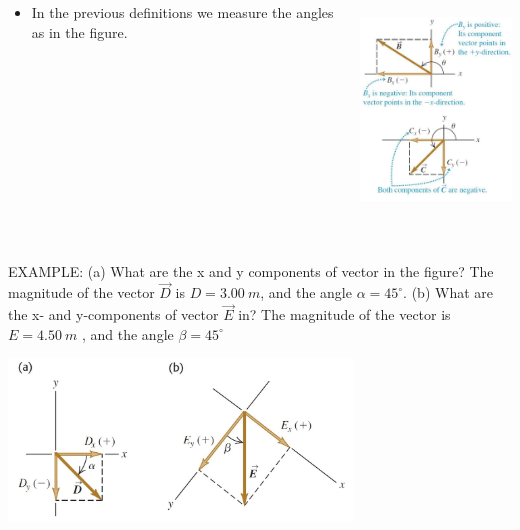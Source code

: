 \documentclass[]{beamer}
\begin{document}

\begin{frame}



   \begin{columns}[c]
   \column{2in}  %

\begin{itemize}
\item In the previous definitions we measure the angles as in the figure.
\end{itemize}


  
   \column{2in}




  \begin{center}
  \includegraphics[height=2.5in]{images/component_vec3.jpg}
\end{center}


   \end{columns}


 \end{frame}




\begin{frame}


EXAMPLE:  (a) What are the x and y components of vector in the figure?
The magnitude of the vector $\vec{D}$  is $D=3.00~m$, and the angle $\alpha=45^\circ$. 
(b) What are the x- and y-components of vector $\vec{E}$  in? The magnitude of the vector is $E=4.50~m$ , and the
angle $\beta=45^\circ$



  \begin{center}
  \includegraphics[height=1.7in]{images/EXAMPLE_vec_comp.jpg}
\end{center}



 \end{frame}
\end{document}
